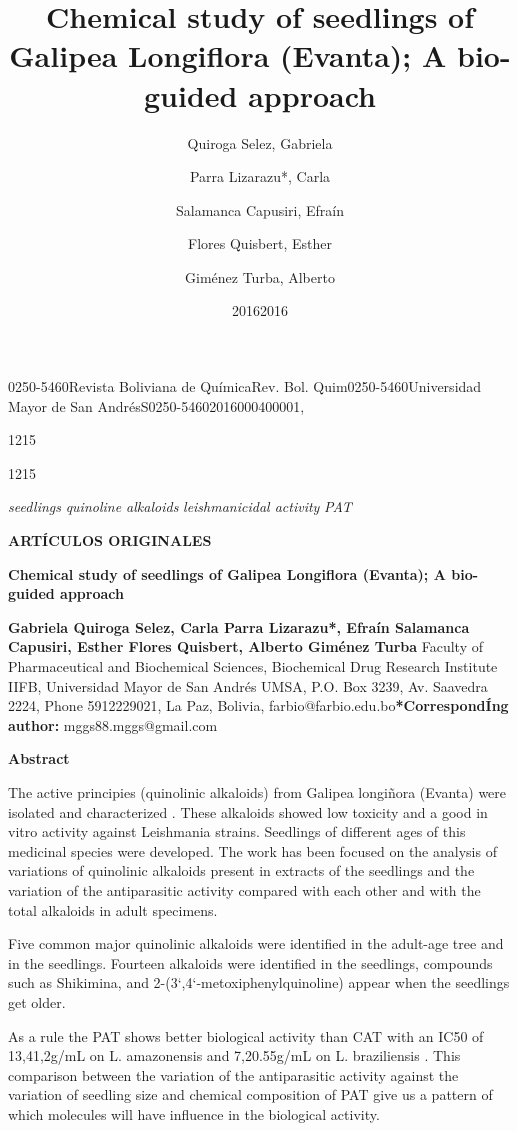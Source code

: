 \documentclass{article}
\begin{document}
\title{Chemical study of seedlings of Galipea Longiflora (Evanta); A bio-guided
approach}
\author{Quiroga Selez, Gabriela
\and Parra Lizarazu*, Carla
\and Salamanca Capusiri, Efraín
\and Flores Quisbert, Esther
\and Giménez Turba, Alberto
}

\maketitle

0250-5460Revista Boliviana de QuímicaRev. Bol. Quim0250-5460Universidad Mayor de
San AndrésS0250-54602016000400001, \date{2016}{12}{15}
\date{2016}{12}{15}
\newcommand{\volume}{33}
\newcommand{\numero}{4}
\newcommand{\fpage}{134}
\newcommand{\lpage}{141}
\newcommand{\copyrightstatement}{}
\newcommand{\copyrightyear}{}

\textit{seedlings}
\textit{quinoline alkaloids}
\textit{leishmanicidal activity}
\textit{PAT}

\textbf{ARTÍCULOS ORIGINALES}

\textbf{Chemical study of seedlings of Galipea Longiflora (Evanta); A bio-guided
approach}

\textbf{Gabriela Quiroga Selez, Carla Parra Lizarazu*, Efraín Salamanca
Capusiri, Esther Flores Quisbert, Alberto Giménez Turba }
Faculty of Pharmaceutical and Biochemical Sciences, Biochemical Drug Research
Institute IIFB, Universidad Mayor de San Andrés UMSA, P.O. Box 3239, Av.
Saavedra 2224, Phone 5912229021, La Paz, Bolivia,
farbio@farbio.edu.bo\textbf{*CorrespondÍng author:}
mggs88.mggs@gmail.com

\textbf{Abstract}

The active principies (quinolinic alkaloids) from Galipea longiñora (Evanta)
were isolated and characterized . These alkaloids showed low toxicity and a good
in vitro activity against Leishmania strains. Seedlings of different ages of
this medicinal species were developed. The work has been focused on the analysis
of variations of quinolinic alkaloids present in extracts of the seedlings and
the variation of the antiparasitic activity compared with each other and with
the total alkaloids in adult specimens.

Five common major quinolinic alkaloids were identified in the adult-age tree and
in the seedlings. Fourteen alkaloids were identified in the seedlings, compounds
such as Shikimina, and 2-(3`,4`-metoxiphenylquinoline) appear when the seedlings
get older.

As a rule the PAT shows better biological activity than CAT with an IC50 of
13,41,2g/mL on L. amazonensis and 7,20.55g/mL on L. braziliensis . This
comparison between the variation of the antiparasitic activity against the
variation of seedling size and chemical composition of PAT give us a pattern of
which molecules will have influence in the biological activity.
\end{document}
